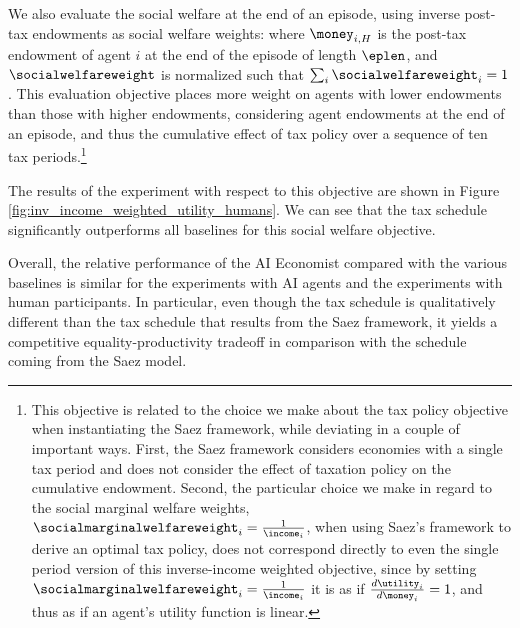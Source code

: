 We also evaluate the social welfare at the end of an episode,
using inverse post-tax endowments as social welfare weights:
where $\money_{i, H}$ is the post-tax endowment of agent $i$ at the end of the episode of length $\eplen$, and $\socialwelfareweight$ is normalized such that $\sum_i \socialwelfareweight_i = 1$.
This evaluation objective
places more weight on agents with lower endowments  than those with higher endowments, considering
agent endowments at the end of an episode, and thus the cumulative effect of tax
policy over a sequence of ten tax periods.\footnote{This objective is related  to the choice we make about the tax policy objective  when  instantiating the Saez  framework, while deviating in a couple of important ways. First, the Saez framework  considers economies with a single tax period and does not consider the effect of taxation policy on the cumulative endowment.
Second, the particular choice we make in regard to the social marginal welfare weights, $\socialmarginalwelfareweight_i = \frac{1}{\income_i}$, when using Saez's framework to derive an optimal tax policy, does not  correspond directly to even the single period version of this inverse-income weighted objective, since by setting $\socialmarginalwelfareweight_i = \frac{1}{\income_i}$ it is as if  $\frac{d\utility_i}{d\money_i}=1$, and thus as if an agent's utility function is linear.}

The results of the experiment with respect to this objective are shown in Figure \ref{fig:inv_income_weighted_utility_humans}.
We can see that the \camelback{} tax schedule  significantly outperforms all baselines for this social
welfare objective.


Overall, the  relative  performance of the AI Economist compared with the various baselines
is similar for the experiments with AI agents and the experiments with human participants. In particular, even though the \camelback{} tax schedule is qualitatively different than the tax schedule that results from the Saez framework, it yields a competitive equality-productivity tradeoff in comparison with the schedule coming from the Saez model.
